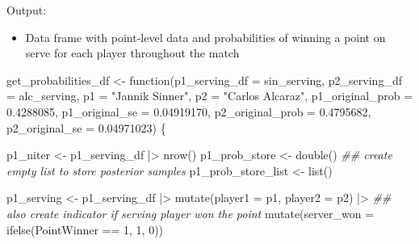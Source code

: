 \documentclass[
  letterpaper,
  DIV=11,
  numbers=noendperiod]{scrartcl}
\newenvironment{Shaded}{\begin{snugshade}}{\end{snugshade}}
\newcommand{\AttributeTok}[1]{\textcolor[rgb]{0.40,0.45,0.13}{#1}}
\newcommand{\ControlFlowTok}[1]{\textcolor[rgb]{0.00,0.23,0.31}{#1}}
\newcommand{\DecValTok}[1]{\textcolor[rgb]{0.68,0.00,0.00}{#1}}
\newcommand{\DocumentationTok}[1]{\textcolor[rgb]{0.37,0.37,0.37}{\textit{#1}}}
\newcommand{\FloatTok}[1]{\textcolor[rgb]{0.68,0.00,0.00}{#1}}
\newcommand{\FunctionTok}[1]{\textcolor[rgb]{0.28,0.35,0.67}{#1}}
\newcommand{\NormalTok}[1]{\textcolor[rgb]{0.00,0.23,0.31}{#1}}
\newcommand{\OtherTok}[1]{\textcolor[rgb]{0.00,0.23,0.31}{#1}}
\newcommand{\SpecialCharTok}[1]{\textcolor[rgb]{0.37,0.37,0.37}{#1}}
\newcommand{\StringTok}[1]{\textcolor[rgb]{0.13,0.47,0.30}{#1}}
\providecommand{\tightlist}{%
  \setlength{\itemsep}{0pt}\setlength{\parskip}{0pt}}\usepackage{longtable,booktabs,array}
\begin{document}
Output:

\begin{itemize}
\tightlist
\item
  Data frame with point-level data and probabilities of winning a point
  on serve for each player throughout the match
\end{itemize}

\linespread{0.9}

\begin{Shaded}
\begin{Highlighting}[]
\NormalTok{get\_probabilities\_df }\OtherTok{\textless{}{-}} \ControlFlowTok{function}\NormalTok{(}\AttributeTok{p1\_serving\_df =}\NormalTok{ sin\_serving,}
                                 \AttributeTok{p2\_serving\_df =}\NormalTok{ alc\_serving,}
                                 \AttributeTok{p1 =} \StringTok{"Jannik Sinner"}\NormalTok{,}
                                 \AttributeTok{p2 =} \StringTok{"Carlos Alcaraz"}\NormalTok{,}
                                 \AttributeTok{p1\_original\_prob =} \FloatTok{0.4288085}\NormalTok{,}
                                 \AttributeTok{p1\_original\_se =} \FloatTok{0.04919170}\NormalTok{,}
                                 \AttributeTok{p2\_original\_prob =} \FloatTok{0.4795682}\NormalTok{,}
                                 \AttributeTok{p2\_original\_se =} \FloatTok{0.04971023}\NormalTok{) \{}
  
\NormalTok{  p1\_niter }\OtherTok{\textless{}{-}}\NormalTok{ p1\_serving\_df }\SpecialCharTok{|\textgreater{}} \FunctionTok{nrow}\NormalTok{()}
\NormalTok{  p1\_prob\_store }\OtherTok{\textless{}{-}} \FunctionTok{double}\NormalTok{()}
  \DocumentationTok{\#\# create empty list to store posterior samples}
\NormalTok{  p1\_prob\_store\_list }\OtherTok{\textless{}{-}} \FunctionTok{list}\NormalTok{()}
  
\NormalTok{  p1\_serving }\OtherTok{\textless{}{-}}\NormalTok{ p1\_serving\_df }\SpecialCharTok{|\textgreater{}}
    \FunctionTok{mutate}\NormalTok{(}\AttributeTok{player1 =}\NormalTok{ p1,}
           \AttributeTok{player2 =}\NormalTok{ p2) }\SpecialCharTok{|\textgreater{}}
    \DocumentationTok{\#\# also create indicator if serving player won the point}
    \FunctionTok{mutate}\NormalTok{(}\AttributeTok{server\_won =} \FunctionTok{ifelse}\NormalTok{(PointWinner }\SpecialCharTok{==} \DecValTok{1}\NormalTok{, }\DecValTok{1}\NormalTok{, }\DecValTok{0}\NormalTok{))}
  

\end{Highlighting}
\end{Shaded}
\end{document}
